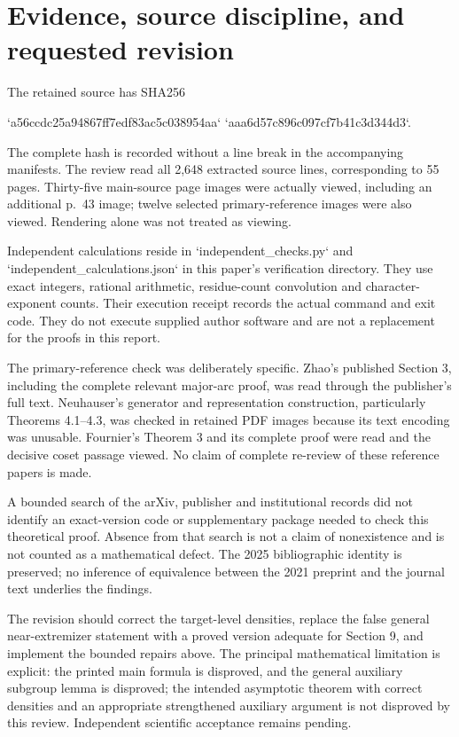 \documentclass[10pt]{article}
\begin{document}
\section*{Evidence, source discipline, and requested revision}
The retained source has SHA256\par
`a56ccdc25a94867ff7edf83ac5c038954aa`
`aaa6d57c896c097cf7b41c3d344d3`.\par
The complete hash is recorded without a line break in the accompanying manifests. The review read all 2,648 extracted source lines, corresponding to 55 pages. Thirty-five main-source page images were actually viewed, including an additional p. 43 image; twelve selected primary-reference images were also viewed. Rendering alone was not treated as viewing.\par
Independent calculations reside in `independent\_checks.py` and `independent\_calculations.json` in this paper’s verification directory. They use exact integers, rational arithmetic, residue-count convolution and character-exponent counts. Their execution receipt records the actual command and exit code. They do not execute supplied author software and are not a replacement for the proofs in this report.\par
The primary-reference check was deliberately specific. Zhao’s published Section 3, including the complete relevant major-arc proof, was read through the publisher’s full text. Neuhauser’s generator and representation construction, particularly Theorems 4.1–4.3, was checked in retained PDF images because its text encoding was unusable. Fournier’s Theorem 3 and its complete proof were read and the decisive coset passage viewed. No claim of complete re-review of these reference papers is made.\par
A bounded search of the arXiv, publisher and institutional records did not identify an exact-version code or supplementary package needed to check this theoretical proof. Absence from that search is not a claim of nonexistence and is not counted as a mathematical defect. The 2025 bibliographic identity is preserved; no inference of equivalence between the 2021 preprint and the journal text underlies the findings.\par
The revision should correct the target-level densities, replace the false general near-extremizer statement with a proved version adequate for Section 9, and implement the bounded repairs above. The principal mathematical limitation is explicit: the printed main formula is disproved, and the general auxiliary subgroup lemma is disproved; the intended asymptotic theorem with correct densities and an appropriate strengthened auxiliary argument is not disproved by this review. Independent scientific acceptance remains pending.\par
\end{document}
